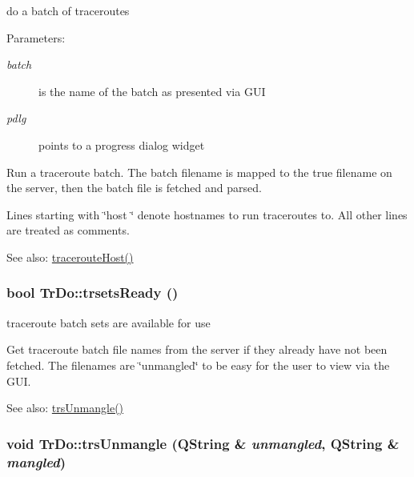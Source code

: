 do a batch of traceroutes \begin{Desc}
\item[Parameters:]
\begin{description}
\item[{\em batch}]is the name of the batch as presented via GUI \item[{\em pdlg}]points to a progress dialog widget\end{description}
\end{Desc}
Run a traceroute batch. The batch filename is mapped to the true filename on the server, then the batch file is fetched and parsed.

Lines starting with \char`\"{}host \char`\"{} denote hostnames to run traceroutes to. All other lines are treated as comments. \begin{Desc}
\item[See also:]\hyperlink{classTrDo_13b09aaa50b54aa250c327007232ef35}{tracerouteHost()} \end{Desc}
\hypertarget{classTrDo_fe15575c4b2b447b064c833c25370dca}{
\subsubsection[trsetsReady]{\setlength{\rightskip}{0pt plus 5cm}bool TrDo::trsetsReady ()}}
\label{classTrDo_fe15575c4b2b447b064c833c25370dca}


traceroute batch sets are available for use 

Get traceroute batch file names from the server if they already have not been fetched. The filenames are \char`\"{}unmangled\char`\"{} to be easy for the user to view via the GUI. \begin{Desc}
\item[See also:]\hyperlink{classTrDo_3bbf80bc98ceb20339ff0497c99ba199}{trsUnmangle()} \end{Desc}
\hypertarget{classTrDo_3bbf80bc98ceb20339ff0497c99ba199}{
\subsubsection[trsUnmangle]{\setlength{\rightskip}{0pt plus 5cm}void TrDo::trsUnmangle (QString \& {\em unmangled}, \/  QString \& {\em mangled})}}
\label{classTrDo_3bbf80bc98ceb20339ff0497c99ba199}


